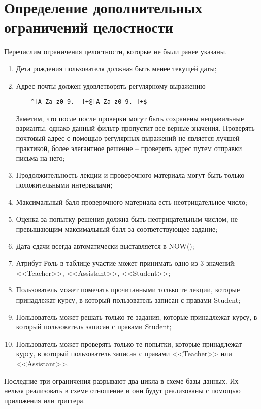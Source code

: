 \documentclass[a4paper,14pt]{article}
\begin{document}
\section{Определение дополнительных ограничений целостности}
Перечислим ограничения целостности, которые не были ранее указаны.
\begin{enumerate}
	\item Дета рождения пользователя должная быть менее текущей даты;
	\item Адрес почты должен удовлетворять регулярному выражению 
	
	\begin{lstlisting}	
	^[A-Za-z0-9._-]+@[A-Za-z0-9.-]+$
	\end{lstlisting}
	
	Заметим, что после после проверки могут быть сохранены неправильные варианты, однако данный фильтр пропустит все верные значения.
	Проверять почтовый адрес с помощью регулярных выражений не является лучшей практикой, более элегантное решение -- проверить адрес путем отправки письма на него;
	\item  Продолжительность лекции и проверочного материала могут быть только положительными интервалами;
	\item Максимальный балл проверочного материала есть неотрицательное число;
	\item Оценка за попытку решения должна быть неотрицательным числом, не превышающим максимальный балл за соответствующее задание;
	\item Дата сдачи всегда автоматически выставляется в NOW();
	\item Атрибут Роль в таблице участие может принимать одно из 3 значений: <<Teacher>>, <<Assistant>>, <<Student>>;
	\item Пользователь может помечать прочитанными только те лекции, которые принадлежат курсу, в который пользователь записан с правами Student;
	\item Пользователь может решать только те задания, которые принадлежат курсу, в который пользователь записан с правами Student;
	\item Пользователь может проверять только те попытки, которые принадлежат курсу, в который пользователь записан с правами <<Teacher>> или <<Assistant>>.
\end{enumerate}

Последние три ограничения разрывают два цикла в схеме базы данных.
Их нельзя реализовать в схеме отношение и они будут реализованы с помощью приложения или триггера.
\end{document}
